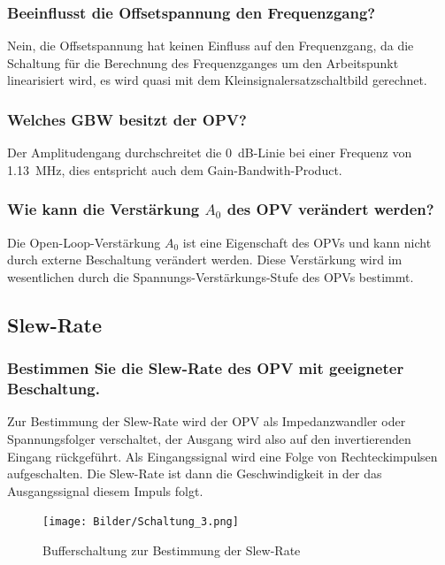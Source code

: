 \subsubsection{Beeinflusst die Offsetspannung den Frequenzgang?}

Nein, die Offsetspannung hat keinen Einfluss auf den Frequenzgang, da die Schaltung für die Berechnung des Frequenzganges um den Arbeitspunkt linearisiert wird, es wird quasi mit dem Kleinsignalersatzschaltbild gerechnet.

\subsubsection{Welches GBW besitzt der OPV?}

Der Amplitudengang durchschreitet die \SI{0}{dB}-Linie bei einer Frequenz von \SI{1.13}{\mega \hertz}, dies entspricht auch dem Gain-Bandwith-Product.

\subsubsection{Wie kann die Verstärkung $A_0$ des OPV verändert werden?}

Die Open-Loop-Verstärkung $A_0$ ist eine Eigenschaft des OPVs und kann nicht durch externe Beschaltung verändert werden. Diese Verstärkung wird im wesentlichen durch die Spannungs-Verstärkungs-Stufe des OPVs bestimmt.

\subsection{Slew-Rate}

\subsubsection{Bestimmen Sie die Slew-Rate des OPV mit geeigneter Beschaltung.}

Zur Bestimmung der Slew-Rate wird der OPV als Impedanzwandler oder Spannungsfolger verschaltet, der Ausgang wird also auf den invertierenden Eingang rückgeführt. Als Eingangssignal wird eine Folge von Rechteckimpulsen aufgeschalten. Die Slew-Rate ist dann die Geschwindigkeit in der das Ausgangssignal diesem Impuls folgt.

\begin{figure}[H]
    \centering
    \texttt{[image: Bilder/Schaltung\_3.png]}
    \caption{Bufferschaltung zur Bestimmung der Slew-Rate}
    \label{fig:my_label}
\end{figure}


